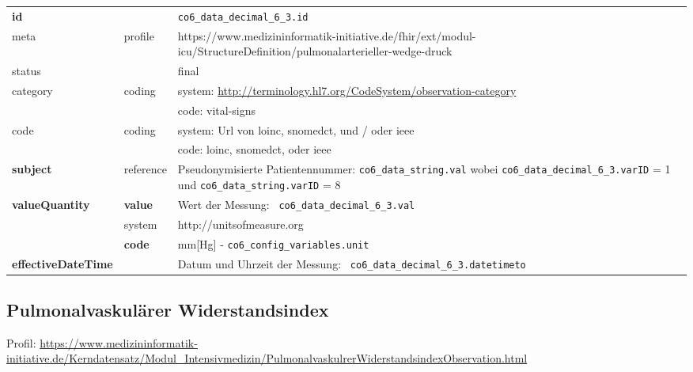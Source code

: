 \begin{longtable}{|l|l|p{7.5cm}|}
        \hline
        \rowcolor{lightgray} \multicolumn{3}{|l|}{Data Mapping (inhaltlich)} \\ \hline
        \textbf{id} &  & \texttt{co6\_data\_decimal\_6\_3.id} \\ \hline
	meta & profile & https://www.medizininformatik-initiative.de/fhir/ext/modul-icu/StructureDefinition/pulmonalarterieller-wedge-druck \\ \hline 
	status &  & final   \\ \hline 
	category & coding & system: \url{http://terminology.hl7.org/CodeSystem/observation-category} \\
\cline{3-3}
	& & code: vital-signs\\ \hline
	code & coding & system: Url von \ac{loinc}, \ac{snomedct}, und / oder \ac{ieee} \\ 
	\cline{3-3} 
	 &  & code: \ac{loinc}, \ac{snomedct}, oder \ac{ieee} \\ \hline
	 \textbf{subject} & reference & Pseudonymisierte Patientennummer: \texttt{co6\_data\_string.val} wobei \texttt{co6\_data\_decimal\_6\_3.varID} = 1 und \texttt{co6\_data\_string.varID} = 8 \\ \hline
	 \textbf{valueQuantity}  & \textbf{value} & Wert der Messung: \texttt{
co6\_data\_decimal\_6\_3.val} \\
        \cline{2-3}
         & system & http://unitsofmeasure.org \\
         \cline{2-3}
         & \textbf{code} & mm[Hg] - \texttt{co6\_config\_variables.unit} \\ \hline
     \textbf{effectiveDateTime}  & & Datum und Uhrzeit der Messung: \texttt{
co6\_data\_decimal\_6\_3.datetimeto} \\
   \hline
\end{longtable}

\subsection{Pulmonalvaskulärer Widerstandsindex} 

Profil: \url{https://www.medizininformatik-initiative.de/Kerndatensatz/Modul_Intensivmedizin/PulmonalvaskulrerWiderstandsindexObservation.html}

